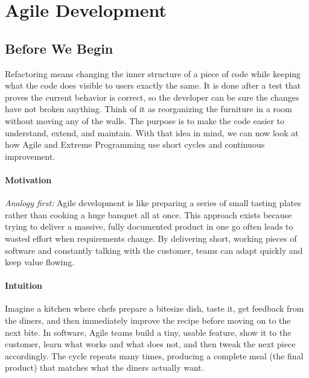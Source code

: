 \documentclass[12pt, a4paper]{article}
\begin{document}
\newpage

\section{Agile Development}

\subsection{Before We Begin}
Refactoring means changing the inner structure of a piece of code while keeping what the code does visible to users exactly the same.  
It is done after a test that proves the current behavior is correct, so the developer can be sure the changes have not broken anything.  
Think of it as reorganizing the furniture in a room without moving any of the walls.  
The purpose is to make the code easier to understand, extend, and maintain.  
With that idea in mind, we can now look at how Agile and Extreme Programming use short cycles and continuous improvement.

\paragraph{Motivation}
\textit{Analogy first:} Agile development is like preparing a series of small tasting plates rather than cooking a huge banquet all at once.  
This approach exists because trying to deliver a massive, fully documented product in one go often leads to wasted effort when requirements change.  
By delivering short, working pieces of software and constantly talking with the customer, teams can adapt quickly and keep value flowing.

\paragraph{Intuition}
Imagine a kitchen where chefs prepare a bitesize dish, taste it, get feedback from the diners, and then immediately improve the recipe before moving on to the next bite.  
In software, Agile teams build a tiny, usable feature, show it to the customer, learn what works and what does not, and then tweak the next piece accordingly.  
The cycle repeats many times, producing a complete meal (the final product) that matches what the diners actually want.
\end{document}
